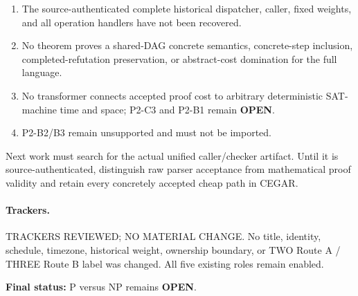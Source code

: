\documentclass[11pt]{article}
\newcommand{\OPEN}{\textbf{OPEN}}
\begin{document}
\begin{enumerate}
\item The source-authenticated complete historical dispatcher, caller, fixed
weights, and all operation handlers have not been recovered.
\item No theorem proves a shared-DAG concrete semantics, concrete-step
inclusion, completed-refutation preservation, or abstract-cost domination for
the full language.
\item No transformer connects accepted proof cost to arbitrary deterministic
SAT-machine time and space; P2-C3 and P2-B1 remain \OPEN.
\item P2-B2/B3 remain unsupported and must not be imported.
\end{enumerate}

Next work must search for the actual unified caller/checker artifact.  Until it
is source-authenticated, distinguish raw parser acceptance from mathematical
proof validity and retain every concretely accepted cheap path in CEGAR.

\paragraph{Trackers.}
TRACKERS REVIEWED; NO MATERIAL CHANGE.  No title, identity, schedule, timezone,
historical weight, ownership boundary, or TWO Route A / THREE Route B label was
changed.  All five existing roles remain enabled.

\vfill
\noindent\textbf{Final status:} P versus NP remains \OPEN.

\end{document}
